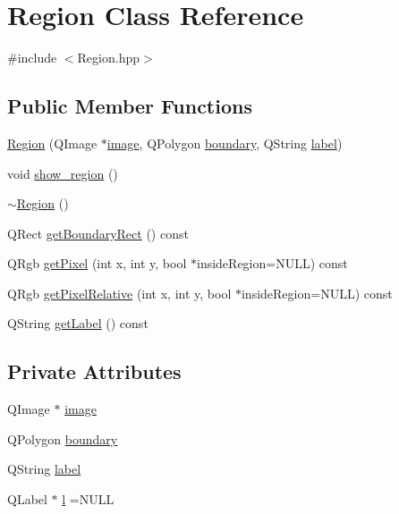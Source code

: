 \hypertarget{class_region}{\section{Region Class Reference}
\label{class_region}
}


{\ttfamily \#include $<$Region.\+hpp$>$}

\subsection*{Public Member Functions}
\begin{DoxyCompactItemize}
\item 
\hyperlink{class_region_a0e9c8974b3be20ce12a4b823f9f3f636}{Region} (Q\+Image $\ast$\hyperlink{class_region_a090b8bc9a8c73f8f874d8d439a0843be}{image}, Q\+Polygon \hyperlink{class_region_a4a59ef37013f3a6515a79317b0f0b4c0}{boundary}, Q\+String \hyperlink{class_region_afcc063386e02be883d71eaf5bcef2a55}{label})
\item 
void \hyperlink{class_region_ad2572028c1a4653a14dbfb1b622aa03e}{show\+\_\+region} ()
\item 
\hyperlink{class_region_a3c3670fff78f7511d156e3b2f0bc6266}{$\sim$\+Region} ()
\item 
Q\+Rect \hyperlink{class_region_a12c653b5aa89c899e2680c9dc1bbf46d}{get\+Boundary\+Rect} () const 
\item 
Q\+Rgb \hyperlink{class_region_acc0edaac14854ccc448f419844a722bf}{get\+Pixel} (int x, int y, bool $\ast$inside\+Region=N\+U\+L\+L) const 
\item 
Q\+Rgb \hyperlink{class_region_a421786f57555f6348ece3fa33eb86594}{get\+Pixel\+Relative} (int x, int y, bool $\ast$inside\+Region=N\+U\+L\+L) const 
\item 
Q\+String \hyperlink{class_region_a69d5acb5d1d81b50f225817217f60fdd}{get\+Label} () const 
\end{DoxyCompactItemize}
\subsection*{Private Attributes}
\begin{DoxyCompactItemize}
\item 
Q\+Image $\ast$ \hyperlink{class_region_a090b8bc9a8c73f8f874d8d439a0843be}{image}
\item 
Q\+Polygon \hyperlink{class_region_a4a59ef37013f3a6515a79317b0f0b4c0}{boundary}
\item 
Q\+String \hyperlink{class_region_afcc063386e02be883d71eaf5bcef2a55}{label}
\item 
Q\+Label $\ast$ \hyperlink{class_region_a31cb137d1eab434b70aaa95633e704fe}{l} =N\+U\+L\+L
\end{DoxyCompactItemize}


